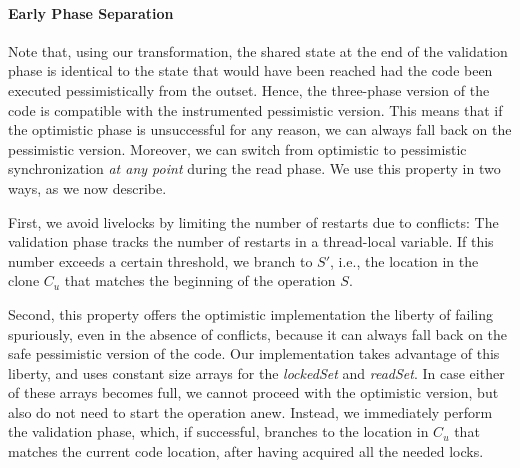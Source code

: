 \paragraph{Early Phase Separation}
Note that, using our transformation, the shared state at the end of the validation phase
is identical to the state that would have been reached had the code been executed pessimistically from
the outset. Hence, the three-phase version of the code is compatible with the instrumented
pessimistic version. This means that if the optimistic phase is unsuccessful for any reason, we can always
fall back on the pessimistic version. Moreover, we can switch from optimistic to pessimistic synchronization
\emph{at any point} during the read phase.
We use this property in two ways, as we now describe.

First, we avoid livelocks by limiting the number of restarts due to conflicts:
The validation phase tracks the number of restarts in a thread-local variable.
If this number exceeds a certain threshold, we branch to $S'$, i.e., the location in the clone $C_u$ that matches
the beginning of the operation $S$.

Second, this property offers the optimistic implementation the liberty of
failing spuriously, even in the absence of conflicts, because it can always fall back on the safe pessimistic version
of the code. Our implementation
takes advantage of this liberty, and uses constant size arrays for the \emph{lockedSet} and \emph{readSet}.
In case either of these arrays becomes full, we cannot proceed with the optimistic version, but also
do not need to start the operation anew.
Instead, we immediately perform the validation phase, which, if successful, branches to the location in $C_u$
that matches the current code location, after having acquired all the needed locks.
